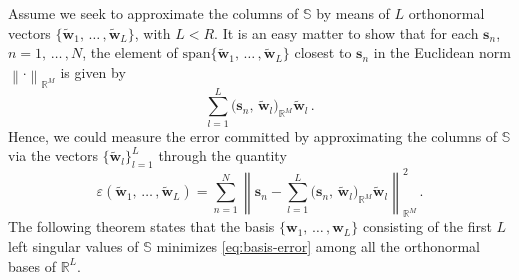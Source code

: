 \documentclass[12pt, a4paper, twoside, openright, notitlepage]{report}
\numberwithin{equation}{chapter}
\theoremstyle{theorem}
\theoremstyle{definition}
\theoremstyle{remark}
\theoremstyle{proposition}
\numberwithin{figure}{chapter}
\newcommand{\norm}[1]{\left\lVert#1\right\rVert}
\newcommand{\wt}[1]{\widetilde{#1}}
\begin{document}
		Assume we seek to approximate the columns of $\mathbb{S}$ by means of $L$ orthonormal vectors $\big\lbrace \wt{\mathbf{w}}_1, \, \ldots \, , \wt{\mathbf{w}}_L \big\rbrace$, with $L < R$. It is an easy matter to show that for each $\mathbf{s}_n$, $n = 1, \, \ldots \, , N$, the element of $\text{span} \big\lbrace \wt{\mathbf{w}}_1, \, \ldots \, , \wt{\mathbf{w}}_L \big\rbrace$ closest to $\mathbf{s}_n$ in the Euclidean norm $\norm{\cdot}_{\mathbb{R}^M}$ is given by
		\begin{equation*}
			\sum_{l = 1}^L \big( \mathbf{s}_n, \, \wt{\mathbf{w}}_l \big)_{\mathbb{R}^M} \wt{\mathbf{w}}_l \, .
		\end{equation*} 
		Hence, we could measure the error committed by approximating the columns of $\mathbb{S}$ via the vectors $\big\lbrace \wt{\mathbf{w}}_l \big\rbrace_{l = 1}^L$ through the quantity
		\begin{equation}
			\label{eq:basis-error}
			\varepsilon(\wt{\mathbf{w}}_1, \, \ldots \, , \wt{\mathbf{w}}_L) = \sum_{n = 1}^N \norm{\mathbf{s}_n - \sum_{l = 1}^L \big( \mathbf{s}_n, \, \wt{\mathbf{w}}_l \big)_{\mathbb{R}^M} \wt{\mathbf{w}}_l}_{\mathbb{R}^M}^2 \, .
		\end{equation}
		The following theorem states that the basis $\big\lbrace \mathbf{w}_1, \, \ldots \, , \mathbf{w}_L \big\rbrace$ consisting of the first $L$ left singular values of $\mathbb{S}$ minimizes \eqref{eq:basis-error} among all the orthonormal bases of $\mathbb{R}^L$.
		
\end{document}

